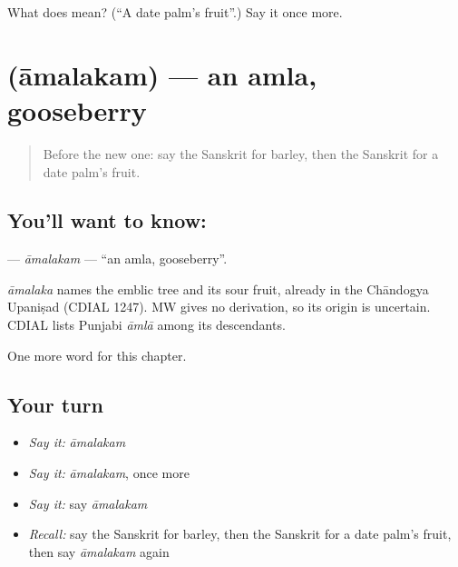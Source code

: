\begin{tcolorbox}[breakable,colback=teal!4,colframe=teal!35!black,title={Before you move on}]
What does  mean? (\textquotedblleft{}A date palm's fruit\textquotedblright{}.) Say it once more.
\end{tcolorbox}
\section[\texorpdfstring{\sk{आमलकम्} (āmalakam)}{आमलकम् (āmalakam)}]{ (āmalakam) — an amla, gooseberry}

\label{lesson:SA-C190-amalakam}



\begin{quote}
Before the new one: say the Sanskrit for barley, then the Sanskrit for a date palm's fruit.
\end{quote}

\subsection*{You'll want to know: }
\textbf{} — \emph{āmalakam} — \textquotedblleft{}an amla, gooseberry\textquotedblright{}.

\begin{cousinweb}
\emph{āmalaka} names the emblic tree and its sour fruit, already in the Chāndogya Upaniṣad (CDIAL 1247). MW gives no derivation, so its origin is uncertain. CDIAL lists Punjabi \emph{āmlā} among its descendants.
\end{cousinweb}

\begin{grammarlens}[title={What you've built}]
One more word for this chapter.
\end{grammarlens}

\subsection*{Your turn}
\begin{itemize}
\raggedright
  \item \emph{Say it:} \emph{āmalakam}
  \item \emph{Say it:} \emph{āmalakam}, once more
  \item \emph{Say it:} say \emph{āmalakam}
  \item \emph{Recall:} say the Sanskrit for barley, then the Sanskrit for a date palm's fruit, then say \emph{āmalakam} again
\end{itemize}

